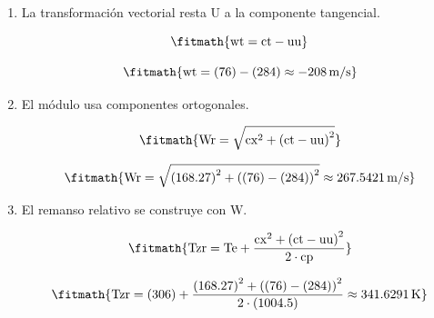 \begin{enumerate}

\item La transformación vectorial resta U a la componente tangencial.

\[\fitmath{\mathrm{wt}=\mathrm{ct}-\mathrm{uu}}\]

\[\fitmath{\mathrm{wt}=(76)-(284)\approx -208\,\mathrm{m/s}}\]

\item El módulo usa componentes ortogonales.

\[\fitmath{\mathrm{Wr}=\sqrt{{\mathrm{cx}}^{2}+{\left(\mathrm{ct}-\mathrm{uu}\right)}^{2}}}\]

\[\fitmath{\mathrm{Wr}=\sqrt{{(168.27)}^{2}+{\left((76)-(284)\right)}^{2}}\approx 267.5421\,\mathrm{m/s}}\]

\item El remanso relativo se construye con W.

\[\fitmath{\mathrm{Tzr}=\mathrm{Te}+\frac{{\mathrm{cx}}^{2}+{\left(\mathrm{ct}-\mathrm{uu}\right)}^{2}}{2\cdot \mathrm{cp}}}\]

\[\fitmath{\mathrm{Tzr}=(306)+\frac{{(168.27)}^{2}+{\left((76)-(284)\right)}^{2}}{2\cdot (1004.5)}\approx 341.6291\,\mathrm{K}}\]

\end{enumerate}
